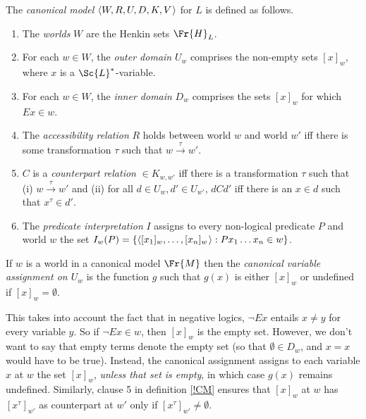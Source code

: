 \documentclass[11pt]{woarticle}
\theoremstyle{break}
\theoremstyle{nonumberplain}
\newcommand{\1}{\;\,|\;\,}
\renewcommand{\t}[1]{\ensuremath{\langle #1  \makebox[.2ex]{}\rangle}}
\begin{document}
\begin{definition}\label{!CM}

  The \emph{canonical model} $\t{W,R,U,D,K,V}$ for $L$ is defined as
  follows.

  \begin{enumerate}

  \item The \emph{worlds} $W$ are the Henkin sets $\Fr{H}_{L}$.

  \item For each $w \in W$, the \emph{outer domain} $U_w$ comprises
    the non-empty sets $[x]_w$, where $x$ is a $\Sc{L}^*$-variable.

  \item For each $w \in W$, the \emph{inner domain} $D_w$ comprises
    the sets $[x]_w$ for which $Ex \in w$.

  \item The \emph{accessibility relation} $R$ holds between world $w$
    and world $w'$ iff there is some transformation $\tau$ such that
    $w \xrightarrow{\tau} w'$.

  \item $C$ is a \emph{counterpart relation} $\in K_{w,w'}$ iff there
    is a transformation $\tau$ such that (i) $w \xrightarrow{\tau} w'$
    and (ii) for all $d\in U_w, d'\in U_{w'}$, $dCd'$
    iff there is an $x \in d$ such that $x^\tau \in d'$.

  \item The \emph{predicate interpretation} $I$ assigns to every non-logical
    predicate $P$ and world $w$ the set
    $I_w(P) = \{ \t{[x_1]_w,\ldots, [x_n]_w} : P x_1\ldots x_n \in w \}$.

  \end{enumerate}

\end{definition}

\begin{definition}\label{!CG}
  If $w$ is a world in a canonical model $\Fr{M}$ then the \emph{canonical
    variable assignment on $U_{w}$} is the function $g$ such that $g(x)$ is
  either $[x]_{w}$ or undefined if $[x]_w = \emptyset$.
\end{definition}

This takes into account the fact that in negative logics, $\neg Ex$ entails
$x \not= y$ for every variable $y$. So if $\neg Ex \in w$, then $[x]_w$ is the
empty set. However, we don't want to say that empty terms denote the empty set
(so that $\emptyset \in D_w$, and $x\!=\!x$ would have to be true). Instead, the
canonical assignment assigns to each variable $x$ at $w$ the set $[x]_w$,
\emph{unless that set is empty}, in which case $g(x)$ remains undefined.
Similarly, clause 5 in definition \ref{!CM} ensures that $[x]_w$ at $w$ has
$[x^\tau]_{w'}$ as counterpart at $w'$ only if $[x^\tau]_{w'} \not= \emptyset$.
\end{document}
